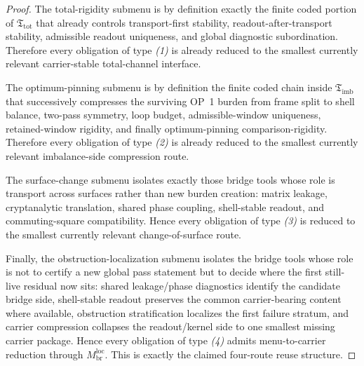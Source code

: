 \begin{proof}
The total-rigidity submenu is by definition exactly the finite coded portion of \(\mathfrak T_{\mathrm{tot}}\) that already controls transport-first stability, readout-after-transport stability, admissible readout uniqueness, and global diagnostic subordination. Therefore every obligation of type \emph{(1)} is already reduced to the smallest currently relevant carrier-stable total-channel interface.

The optimum-pinning submenu is by definition the finite coded chain inside \(\mathfrak T_{\mathrm{imb}}\) that successively compresses the surviving OP~1 burden from frame split to shell balance, two-pass symmetry, loop budget, admissible-window uniqueness, retained-window rigidity, and finally optimum-pinning comparison-rigidity. Therefore every obligation of type \emph{(2)} is already reduced to the smallest currently relevant imbalance-side compression route.

The surface-change submenu isolates exactly those bridge tools whose role is transport across surfaces rather than new burden creation: matrix leakage, cryptanalytic translation, shared phase coupling, shell-stable readout, and commuting-square compatibility. Hence every obligation of type \emph{(3)} is reduced to the smallest currently relevant change-of-surface route.

Finally, the obstruction-localization submenu isolates the bridge tools whose role is not to certify a new global pass statement but to decide where the first still-live residual now sits: shared leakage/phase diagnostics identify the candidate bridge side, shell-stable readout preserves the common carrier-bearing content where available, obstruction stratification localizes the first failure stratum, and carrier compression collapses the readout/kernel side to one smallest missing carrier package. Hence every obligation of type \emph{(4)} admits menu-to-carrier reduction through \(M^{\mathrm{loc}}_{\mathrm{br}}\). This is exactly the claimed four-route reuse structure.
\end{proof}

